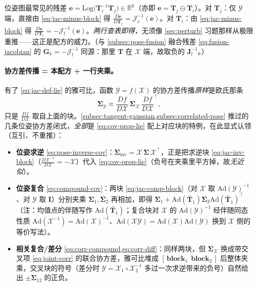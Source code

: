 \begin{example}
位姿图最常见的残差 $\mathbf{e}=\mathrm{Log}\big(\mathbf{T}_i^{-1}\mathbf{T}_j\big)\in\mathbb{R}^6$（亦即 $\mathbf{e}=\mathbf{T}_j\ominus\mathbf{T}_i$）。对 $\mathbf{T}_j$：仅 $\mathcal{Y}$ 端，直接由 \cref{eq:jac-minus-block} 得 $\frac{D\mathbf{e}}{D\mathbf{T}_j}=\boldsymbol{\mathcal{J}}_r^{-1}(\mathbf{e})$。对 $\mathbf{T}_i$：由 \cref{eq:jac-minus-block} 得 $\frac{D\mathbf{e}}{D\mathbf{T}_i}=-\boldsymbol{\mathcal{J}}_l^{-1}(\mathbf{e})$。\emph{两行查表即得}，无须像 \cref{sec:perturb} 习题那样从极限重推——这正是配方的威力。（与 \cref{subsec:pose-fusion} 融合残差 \cref{eq:fusion-jacobian} 的 $\mathbf{G}_k=-\boldsymbol{\mathcal{J}}_l^{-1}$ 同源：那里 $\mathbf{T}$ 在 $\mathcal{X}$ 端，故取负的 $\mathbf{J}_l^{-1}$。）
\end{example}

\paragraph{协方差传播 = 本配方 + 一行夹乘。}有了 \cref{eq:jac-def-lie} 的雅可比，函数 $\mathcal{Y}=f(\mathcal{X})$ 的协方差传播\emph{原样}是欧氏那条
\begin{equation}
  \boldsymbol{\Sigma}_{\mathcal{Y}}\approx\frac{Df}{D\mathcal{X}}\,\boldsymbol{\Sigma}_{\mathcal{X}}\,\frac{Df}{D\mathcal{X}}^{\!\top},
  \label{eq:cov-prop-lie}
\end{equation}
只是 $\frac{Df}{D\mathcal{X}}$ 取自上面的块。\cref{subsec:tangent-gaussian,subsec:correlated-pose} 推过的几条位姿协方差闭式，\emph{全部}是 \cref{eq:cov-prop-lie} 配上对应块的特例，在此显式认领（互引、不重推）：
\begin{itemize}
  \item \textbf{位姿求逆} \cref{eq:pose-inverse-cov}：$\boldsymbol{\Sigma}_{\text{inv}}=\boldsymbol{\mathcal{X}}\,\boldsymbol{\Sigma}\,\boldsymbol{\mathcal{X}}^{\top}$，正是把求逆块 \cref{eq:jac-inv-block}（$\frac{D\mathcal{X}^{-1}}{D\mathcal{X}}=-\boldsymbol{\mathcal{X}}$）代入 \cref{eq:cov-prop-lie}（负号在夹乘里平方掉，故\emph{无近似}）。
  \item \textbf{位姿复合} \cref{eq:compound-cov}：两块 \cref{eq:jac-comp-block}（对 $\mathcal{X}$ 取 $\mathrm{Ad}(\mathcal{Y})^{-1}$、对 $\mathcal{Y}$ 取 $\mathbf{I}$）分别夹乘 $\boldsymbol{\Sigma}_1,\boldsymbol{\Sigma}_2$ 再相加，即得 $\boldsymbol{\Sigma}_1+\mathrm{Ad}(\bar{\mathbf{T}}_1)\boldsymbol{\Sigma}_2\mathrm{Ad}(\bar{\mathbf{T}}_1)^{\top}$（注：均值点的伴随写作 $\mathrm{Ad}(\bar{\mathbf{T}}_1)$；复合块对 $\mathcal{X}$ 的 $\mathrm{Ad}(\mathcal{Y})^{-1}$ 经伴随同态性质 $\mathrm{Ad}(\mathcal{X}^{-1})=\mathrm{Ad}(\mathcal{X})^{-1}$、$\mathrm{Ad}(\mathcal{X}\mathcal{Y})=\mathrm{Ad}(\mathcal{X})\mathrm{Ad}(\mathcal{Y})$ 换到 $\mathcal{X}$ 侧的等价写法）。
  \item \textbf{相关复合/差分} \cref{eq:corr-compound,eq:corr-diff}：同样两块，但 $\boldsymbol{\Sigma}_{\mathcal{X}}$ 换成带交叉项 \cref{eq:joint-corr} 的联合协方差，雅可比堆成 $[\,\mathbf{block}_1\ \ \mathbf{block}_2\,]$ 后整体夹乘，交叉块的符号（差分时 $\mathcal{Y}=\mathcal{X}_1\circ\mathcal{X}_2^{-1}$ 多过一次求逆带来的负号）自然给出 $\pm\boldsymbol{\Sigma}_{12}$ 的正负。
\end{itemize}

